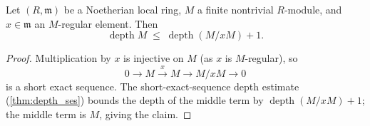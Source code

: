 \begin{lemma}
  \label{lem:depth_quotSMulTop}
  \leanok
  Let \((R, \mathfrak m)\) be a Noetherian local ring, \(M\) a finite nontrivial
  \(R\)-module, and \(x \in \mathfrak m\) an \(M\)-regular element. Then
  \[
    \operatorname{depth} M \;\le\; \operatorname{depth}(M/xM) + 1 .
  \]
\end{lemma}
\begin{proof}
  \leanok
  Multiplication by \(x\) is injective on \(M\) (as \(x\) is \(M\)-regular), so
  \[
    0 \longrightarrow M \xrightarrow{\;x\;} M \longrightarrow M/xM \longrightarrow 0
  \]
  is a short exact sequence. The short-exact-sequence depth estimate
  (\ref{thm:depth_ses}) bounds the depth of the middle term by
  \(\operatorname{depth}(M/xM) + 1\); the middle term is \(M\), giving the claim.
\end{proof}

